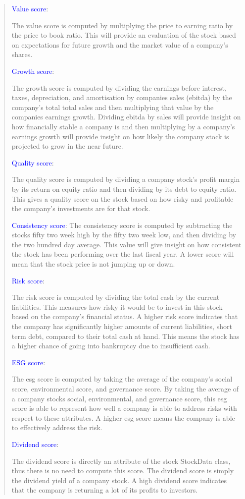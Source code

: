 \documentclass[fontsize=12pt]{article}
\begin{document}
\begin{quote}
\textcolor{blue}{Value score}:

The value score is computed by multiplying the price to earning ratio by the price to book ratio. This will provide an evaluation of the stock based on expectations for future growth and the market value of a company’s shares.

\textcolor{blue}{Growth score}:

The growth score is computed by dividing the earnings before interest, taxes, depreciation, and amortisation by companies sales (ebitda) by the company’s total total sales and then multiplying that value by the companies earnings growth. Dividing ebitda by sales will provide insight on how financially stable a company is and then multiplying by a company's earnings growth will provide insight on how likely the company stock is projected to grow in the near future.

\textcolor{blue}{Quality score}:

The quality score is computed by dividing a company stock's profit margin by its return on equity ratio and then dividing by its debt to equity ratio. This gives a quality score on the stock based on how risky and profitable the company's investments are for that stock.

\textcolor{blue}{Consistency score}:
The consistency score is computed by subtracting the stocks fifty two week high by the fifty two week low, and then dividing by the two hundred day average. This value will give insight on how consistent the stock has been performing over the last fiscal year. A lower score will mean that the stock price is not jumping up or down. 

\textcolor{blue}{Risk score}:

The risk score is computed by dividing the total cash by the current liabilities. This measures how risky it would be to invest in this stock based on the company’s financial status. A higher risk score indicates that the company has significantly higher amounts of current liabilities, short term debt, compared to their total cash at hand. This means the stock has a higher chance of going into
bankruptcy due to insufficient cash.

\textcolor{blue}{ESG score}:

The esg score is computed by taking the average of the company's social score, environmental score, and governance score. By taking the average of a company stocks social, environmental, and governance score, this esg score is able
to represent how well a company is able to address risks with respect to these attributes. A higher esg score means the company is able to effectively address the risk.

\textcolor{blue}{Dividend score}:

The dividend score is directly an attribute of the stock StockData class, thus there is no need to compute this score. The dividend score is simply the dividend yield of a company stock. A high dividend score indicates that the company is returning a lot of its profits to investors. 

\end{quote}
\end{document}
